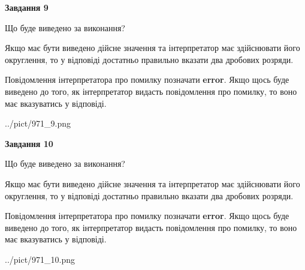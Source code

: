 \documentclass[12pt, ukrainian]{article}
\begin{document}
{\begin {Large}
{\begin {center}\textbf{Завдання 9}\end {center}}\par
Що буде виведено за виконання? \par

Якщо має бути виведено дійсне значення та інтерпретатор має здійснювати його округлення, 
то у відповіді достатньо правильно вказати два дробових розряди.

Повідомлення інтерпретатора про помилку позначати \textbf{error}.
Якщо щось буде виведено до того, як інтерпретатор видасть повідомлення про помилку, 
то воно має вказуватись у відповіді. \par

\begin{center}
	{../pict/971_9.png}
\end{center}
\newpage

{\begin {center}\textbf{Завдання 10}\end {center}}\par
Що буде виведено за виконання? \par

Якщо має бути виведено дійсне значення та інтерпретатор має здійснювати його округлення, 
то у відповіді достатньо правильно вказати два дробових розряди.

Повідомлення інтерпретатора про помилку позначати \textbf{error}.
Якщо щось буде виведено до того, як інтерпретатор видасть повідомлення про помилку, 
то воно має вказуватись у відповіді. \par

\begin{center}
	{../pict/971_10.png}
\end{center}
\newpage

\end {Large}}
\end{document}
